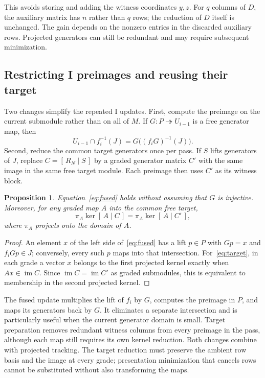 \documentclass[11pt,a4paper]{article}
\newtheorem{proposition}{Proposition}
\newcommand{\im}{\operatorname{im}}
\begin{document}
This avoids storing and adding the witness coordinates $y,z$. For $q$
columns of $D$, the auxiliary matrix has $n$ rather than $q$ rows; the
reduction of $D$ itself is unchanged. The gain depends on the nonzero
entries in the discarded auxiliary rows. Projected generators can still
be redundant and may require subsequent minimization.

\subsection{Restricting I preimages and reusing their target}
Two changes simplify the repeated I updates. First, compute the preimage
on the current submodule rather than on all of $M$. If
$G:P\twoheadrightarrow U_{i-1}$ is a free generator map, then
\begin{equation}\label{eq:fused}
 U_{i-1}\cap f_i^{-1}(J)=G\bigl((f_iG)^{-1}(J)\bigr).
\end{equation}
Second, reduce the common target generators once per pass. If $S$ lifts
generators of $J$, replace $C=[\,R_N\mid S\,]$ by a graded generator
matrix $C'$ with the same image in the same free target module. Each
preimage then uses $C'$ as its witness block.

\begin{proposition}
Equation~\eqref{eq:fused} holds without assuming that $G$ is injective.
Moreover, for any graded map $A$ into the common free target,
\begin{equation}\label{eq:target}
 \pi_A\ker[\,A\mid C\,]=\pi_A\ker[\,A\mid C'\,],
\end{equation}
where $\pi_A$ projects onto the domain of $A$.
\end{proposition}
\begin{proof}
An element $x$ of the left side of~\eqref{eq:fused} has a lift $p\in P$
with $Gp=x$ and $f_iGp\in J$; conversely, every such $p$ maps into
that intersection. For~\eqref{eq:target}, in each grade a vector $x$
belongs to the first projected kernel exactly when $Ax\in\im C$.
Since $\im C=\im C'$ as graded submodules, this is equivalent to
membership in the second projected kernel.
\end{proof}

The fused update multiplies the lift of $f_i$ by $G$, computes the
preimage in $P$, and maps its generators back by $G$. It eliminates a
separate intersection and is particularly useful when the current
generator domain is small. Target preparation removes redundant witness
columns from every preimage in the pass, although each map still requires
its own kernel reduction. Both changes combine with projected tracking.
The target reduction must preserve the ambient row basis and the image
at every grade; presentation minimization that cancels rows cannot be
substituted without also transforming the maps.
\end{document}
